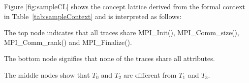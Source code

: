 % 

%
Figure \ref{fig:sampleCL} shows the concept lattice derived from the formal context in
Table~\ref{tab:sampleContext} and is interpreted as follows:

\begin{compactitem}
\item The top node indicates that all traces share MPI\_Init(),
  MPI\_Comm\_size(), MPI\_Comm\_rank() and MPI\_Finalize().
    \item The bottom node signifies that none of the traces share all attributes. 
    \item The middle nodes show that $T_0$ and $T_2$ are different from  $T_1$ and $T_3$.
\end{compactitem}



% 

%


